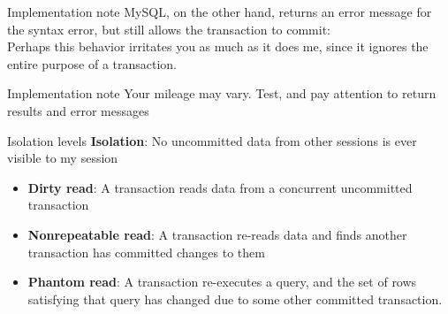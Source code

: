 \documentclass[svgnames]{beamer}
\begin{document}
\begin{frame}{Implementation note}
    MySQL, on the other hand, returns an error message for the syntax error,
    but still allows the transaction to commit: \\
    \vspace{10pt}
    \small {
    }
    \vspace{10pt}
    \pause
    Perhaps this behavior irritates you as much as it does me, since it
    ignores the entire purpose of a transaction.
\end{frame}

\begin{frame}{Implementation note}
    Your mileage may vary. Test, and pay attention to return results and error
    messages
\end{frame}

\begin{frame}{Isolation levels}
    \textbf{Isolation}: No uncommitted data from other sessions is ever visible to my session
    \begin{itemize}
        \item \textbf{Dirty read}: A transaction reads data from a
        concurrent uncommitted transaction
        \item \textbf{Nonrepeatable read}: A transaction re-reads data and
        finds another transaction has committed changes to them
        \item \textbf{Phantom read}: A transaction re-executes a query, and
        the set of rows satisfying that query has changed due to some other
        committed transaction.
    \end{itemize}
\end{frame}
\end{document}
